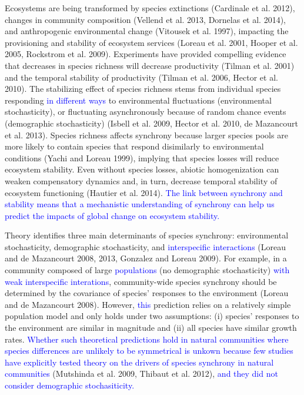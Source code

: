 \documentclass[12pt,]{article}
\begin{document}
Ecosystems are being transformed by species extinctions (Cardinale et
al. 2012), changes in community composition (Vellend et al. 2013,
Dornelas et al. 2014), and anthropogenic environmental change (Vitousek
et al. 1997), impacting the provisioning and stability of ecosystem
services (Loreau et al. 2001, Hooper et al. 2005, Rockstrom et al.
2009). Experiments have provided compelling evidence that decreases in
species richness will decrease productivity (Tilman et al. 2001) and the
temporal stability of productivity (Tilman et al. 2006, Hector et al.
2010). The stabilizing effect of species richness stems from individual
species responding \textcolor{blue}{in different ways} to environmental
fluctuations (environmental stochasticity), or fluctuating
asynchronously because of random chance events (demographic
stochasticity) (Isbell et al. 2009, Hector et al. 2010, {{de
Mazancourt}} et al. 2013). Species richness affects synchrony because
larger species pools are more likely to contain species that respond
disimilarly to environmental conditions (Yachi and Loreau 1999),
implying that species losses will reduce ecosystem stability. Even
without species losses, abiotic homogenization can weaken compensatory
dynamics and, in turn, decrease temporal stability of ecosystem
functioning (Hautier et al. 2014).
\textcolor{blue}{The link between synchrony and stability means that a mechanistic understanding of synchrony can help us predict the impacts of global change on ecosystem stability.}

Theory identifies three main determinants of species synchrony:
environmental stochasticity, demographic stochasticity, and
\textcolor{blue}{interspecific interactions} (Loreau and {{de
Mazancourt}} 2008, 2013, Gonzalez and Loreau 2009). For example, in a
community composed of large \textcolor{blue}{populations} (no
demographic stochasticity)
\textcolor{blue}{with weak interspecific interations}, community-wide
species synchrony should be determined by the covariance of species'
responses to the environment (Loreau and {{de Mazancourt}} 2008).
However, \textcolor{blue}{this} prediction relies on a relatively simple
population model and only holds under two assumptions: (i) species'
responses to the environment are similar in magnitude and (ii) all
species have similar growth rates.
\textcolor{blue}{Whether such theoretical predictions hold in natural communities where species differences are unlikely to be symmetrical is unkown because few studies have explicitly tested theory on the drivers of species synchrony in natural communities}
(Mutshinda et al. 2009, Thibaut et al. 2012),
\textcolor{blue}{and they did not consider demographic stochasiticity.}
\end{document}
